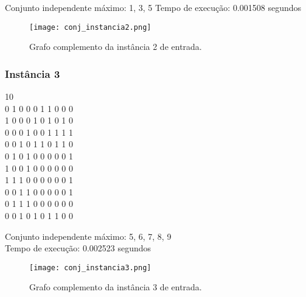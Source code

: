 \documentclass[12pt]{article}
\begin{document}
        \begin{tcolorbox}[title=Saída da instância 2, width=\linewidth, 
          fontupper=\ttfamily, 
          halign=flush left]
            Conjunto independente máximo: {1, 3, 5}
            Tempo de execução: 0.001508 segundos
        \end{tcolorbox}
        
        \begin{figure}[H]
            \centering
            \texttt{[image: conj\_instancia2.png]}
            \caption{Grafo complemento da instância 2 de entrada.}
            \label{fig:instancia1}
        \end{figure}
        
        \subsubsection{Instância 3}
        \begin{tcolorbox}[title=Arquivo de entrada para a instância 3, width=\linewidth, 
          fontupper=\ttfamily, 
          halign=flush left]
            10 \\
            0 1 0 0 0 1 1 0 0 0 \\
            1 0 0 0 1 0 1 0 1 0 \\
            0 0 0 1 0 0 1 1 1 1 \\
            0 0 1 0 1 1 0 1 1 0 \\
            0 1 0 1 0 0 0 0 0 1 \\
            1 0 0 1 0 0 0 0 0 0 \\
            1 1 1 0 0 0 0 0 0 1 \\
            0 0 1 1 0 0 0 0 0 1 \\
            0 1 1 1 0 0 0 0 0 0 \\
            0 0 1 0 1 0 1 1 0 0 \\
        \end{tcolorbox}

        \begin{tcolorbox}[title=Saída da instância 3, width=\linewidth, 
          fontupper=\ttfamily, 
          halign=flush left]
            Conjunto independente máximo: {5, 6, 7, 8, 9}\\
            Tempo de execução: 0.002523 segundos\\
        \end{tcolorbox}

        \begin{figure}[H]
            \centering
            \texttt{[image: conj\_instancia3.png]}
            \caption{Grafo complemento da instância 3 de entrada.}
            \label{fig:instancia1}
        \end{figure}
\end{document}
